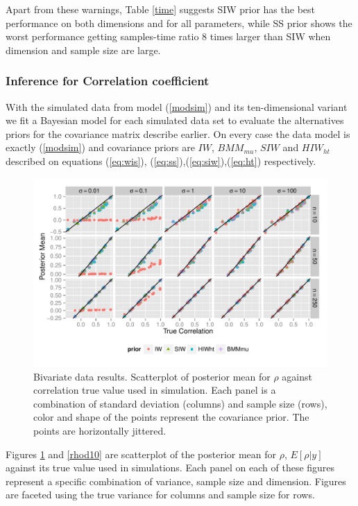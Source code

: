 \documentclass{article}
\begin{document}
Apart from these warnings, Table \ref{time} suggests  SIW prior has the best performance on both dimensions and for all parameters, while SS prior shows  the worst performance getting samples-time ratio 8 times larger than SIW when dimension and sample size are large. 

%
%

\subsubsection{Inference for Correlation coefficient}

With the simulated data from model (\ref{modsim}) and its ten-dimensional variant we fit a Bayesian model for each simulated data set to evaluate the alternatives priors for the covariance matrix describe earlier.  On every case the data model is exactly (\ref{modsim}) and covariance priors are $IW$, $BMM_{mu}$, $SIW$ and $HIW_{ht}$ described on equations (\ref{eq:wis}), (\ref{eq:ss}),(\ref{eq:siw}),(\ref{eq:ht}) respectively.   
\begin{figure}[hbtp]
   \centering
   \includegraphics[width=\textwidth] {fig_rho_d2} 
    \vspace{-.5in}
   \caption{Bivariate data results. Scatterplot of posterior mean for $\rho$  against correlation true value used in simulation. Each panel is a combination of standard deviation (columns) and sample size (rows),  color and shape of the points represent the covariance prior. The points are horizontally jittered. \label{rhod2}}
\end{figure}

Figures \ref{rhod2} and \ref{rhod10} are scatterplot of the posterior mean for $\rho$, $E[\rho\vert y]$ against its true value used in simulations.  Each panel on each of these figures represent a specific combination of variance, sample size and dimension.  Figures are faceted using the true variance for columns and sample size for rows. 
\end{document}
